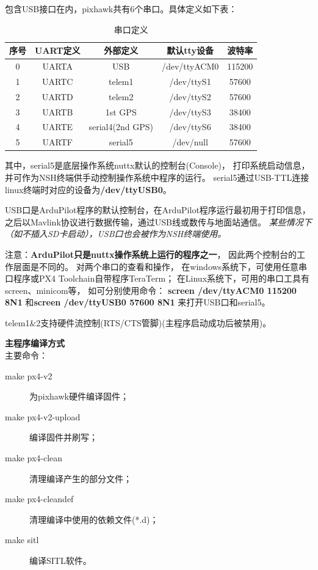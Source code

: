 \documentclass[a4paper,10pt]{ctexart} %
\begin{document}
包含USB接口在内，pixhawk共有6个串口。具体定义如下表：
\begin{table}[h] \centering   %
\caption{串口定义}
\begin{tabular}{c|c|c|c|c}\hline
序号 & UART定义  &	  外部定义		   &  默认tty设备  &	波特率 \\\hline
 0	&	UARTA	&	 USB			&	/dev/ttyACM0	&	115200 \\
 1	&	UARTC	&	 telem1			&	/dev/ttyS1	&	57600 \\
 2	&	UARTD	&	 telem2			&	/dev/ttyS2	&	57600 \\
 3	&	UARTB	&	1st GPS			&	/dev/ttyS3	&	38400 \\
 4	&	UARTE	& serial4(2nd GPS)	&	/dev/ttyS6	&	38400 \\
 5	&	UARTF	&	serial5			&	/dev/null	&	57600 \\\hline
\end{tabular}\label{table1}
\end{table}

其中，serial5是底层操作系统nuttx默认的控制台(Console)，
打印系统启动信息，并可作为NSH终端供手动控制操作系统中程序的运行。
serial5通过USB-TTL连接linux终端时对应的设备为\textbf{/dev/ttyUSB0}。

USB口是ArduPilot程序的默认控制台，在ArduPilot程序运行最初用于打印信息，
之后以Mavlink协议进行数据传输，通过USB线或数传与地面站通信。
\textit{某些情况下（如不插入SD卡启动），USB口也会被作为NSH终端使用。}

注意：\textbf{ArduPilot只是nuttx操作系统上运行的程序之一}，
因此两个控制台的工作层面是不同的。
对两个串口的查看和操作，
在windows系统下，可使用任意串口程序或PX4 Toolchain自带程序TeraTerm；
在Linux系统下，可用的串口工具有screen、minicom等，
如可分别使用命令：
\textbf{screen /dev/ttyACM0 115200 8N1}
和\textbf{screen /dev/ttyUSB0 57600 8N1}
来打开USB口和serial5。

telem1\&2支持硬件流控制(RTS/CTS管脚)(主程序启动成功后被禁用)。

\vspace{20pt}
\noindent \textbf{主程序编译方式}\\

\noindent 主要命令：\\
\vspace{-20pt}
\begin{description}
\item[make px4-v2] 为pixhawk硬件编译固件；
\item[make px4-v2-upload] 编译固件并刷写；
\item[make px4-clean] 清理编译产生的部分文件；
\item[make px4-cleandef] 清理编译中使用的依赖文件(*.d)；
\item[make sitl] 编译SITL软件。
\end{description}
\end{document}
